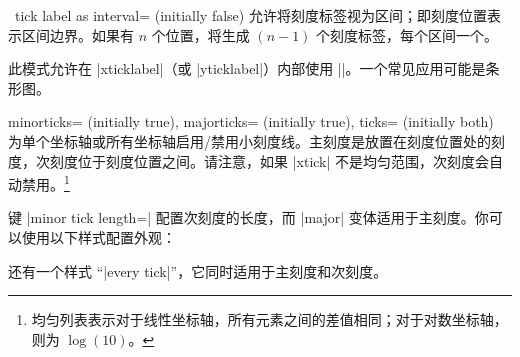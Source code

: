 \begin{pgfplotsxykey}{\x\ tick label as interval= (initially false)}
\label{key:pgfplots:ticklabelasinterval}
    允许将刻度标签视为区间；即刻度位置表示区间边界。如果有 $n$ 个位置，将生成 $(n-1)$ 个刻度标签，每个区间一个。
\begin{codeexample}[]
\end{codeexample}
    此模式允许在 |xticklabel|（或 |yticklabel|）内部使用 |\nexttick|。一个常见应用可能是条形图。
\begin{codeexample}[]
\end{codeexample}
\end{pgfplotsxykey}

\begin{pgfplotsxykeylist}{%
    \x minorticks= (initially true),
    \x majorticks= (initially true),
    ticks= (initially both)%
}
    为单个坐标轴或所有坐标轴启用/禁用小刻度线。主刻度是放置在刻度位置处的刻度，次刻度位于刻度位置之间。请注意，如果 |xtick| 不是均匀范围，次刻度会自动禁用。\footnote{均匀列表表示对于线性坐标轴，所有元素之间的差值相同；对于对数坐标轴，则为 $\log(10)$。}

    键 |minor tick length=| 配置次刻度的长度，而 |major| 变体适用于主刻度。你可以使用以下样式配置外观：
\begin{codeexample}
\end{codeexample}
    还有一个样式 ``|every tick|''，它同时适用于主刻度和次刻度。
\end{pgfplotsxykeylist}

